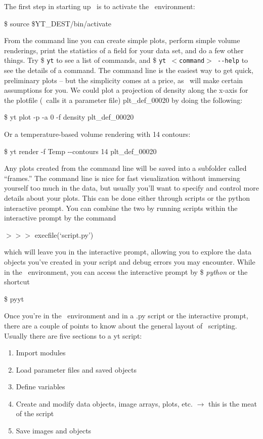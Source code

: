 The first step in starting up \yt\ is to activate the \yt\ environment:

\$ source \$YT\_DEST/bin/activate

From the command line you can create simple plots, perform simple
volume renderings, print the statistics of a field for your data set,
and do a few other things. Try {\$ \tt yt} to see a list of commands,
and {\$ \tt yt {\footnotesize$<$}command{\footnotesize$>$} -{}-help}
to see the details of a command. The command line is the easiest way
to get quick, preliminary plots -- but the simplicity comes at a
price, as \yt\ will make certain assumptions for you. We could plot a
projection of density along the x-axis for the plotfile (\yt\ calls it a
parameter file) plt\_def\_00020 by doing the following:

\$ yt plot -p -a 0 -f density plt\_def\_00020

Or a temperature-based volume rendering with 14 contours:

\$ yt render -f Temp -{}-contours 14 plt\_def\_00020

Any plots created from the command line will be saved into a
subfolder called ``frames.'' The command line is nice for fast
visualization without immersing yourself too much in the data, but
usually you'll want to specify and control more details about your
plots. This can be done either through scripts or the python
interactive prompt. You can combine the two by running scripts within
the interactive prompt by the command

{\scriptsize$>>>$} execfile(`script.py')

which will leave you in the interactive prompt, allowing you to
explore the data objects you've created in your script and debug
errors you may encounter. While in the \yt\ environment, you can access
the interactive prompt by {\$ \it python} or the shortcut

\$ pyyt

Once you're in the \yt\ environment and in a .py script or the
interactive prompt, there are a couple of points to know about the
general layout of \yt\ scripting. Usually there are five sections to a
yt script:
\begin{enumerate}
\item
\indent Import modules
\item
\indent Load parameter files and saved objects
\item
\indent Define variables
\item
\indent Create and modify data objects, image arrays, plots,
etc. $\rightarrow$ this is the meat of the script
\item
\indent Save images and objects
\end{enumerate}

